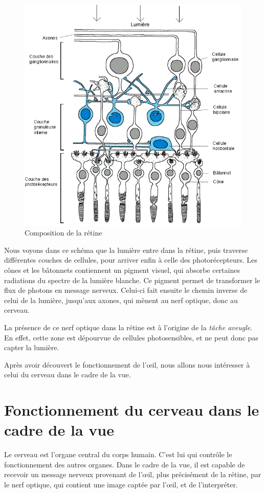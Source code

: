 \documentclass[a4paper, 12pt, onecolumn, openany]{report}
\begin{document}
	\begin{figure}[h]
	\begin{center}
	\includegraphics[scale=0.5]{retine.png}
	\end{center}
	\caption{Composition de la rétine}
	\label{Composition de la rétine}
	\end{figure}
	
	Nous voyons dans ce schéma que la lumière entre dans la rétine, puis traverse différentes couches de cellules, pour arriver enfin à celle des photorécepteurs. Les cônes et les bâtonnets contiennent un pigment visuel, qui absorbe certaines radiations du spectre de la lumière blanche. Ce pigment permet de transformer le flux de photons en message nerveux. Celui-ci fait ensuite le chemin inverse de celui de la lumière, jusqu'aux axones, qui mènent au nerf optique, donc au cerveau.
	
	La présence de ce nerf optique dans la rétine est à l'origine de la \textit{tâche aveugle}. En effet, cette zone est dépourvue de cellules photosensibles, et ne peut donc pas capter la lumière.
	
	Après avoir découvert le fonctionnement de l’œil, nous allons nous intéresser à celui du cerveau dans le cadre de la vue.

\newpage
	\section{Fonctionnement du cerveau dans le cadre de la vue}
	Le cerveau est l’organe central du corps humain. C’est lui qui contrôle le fonctionnement des autres organes. Dans le cadre de la vue, il est capable de recevoir un message nerveux provenant de l’œil, plus précisément de la rétine, par le nerf optique, qui contient une image captée par l’œil, et de l’interpréter.
	
\end{document}
